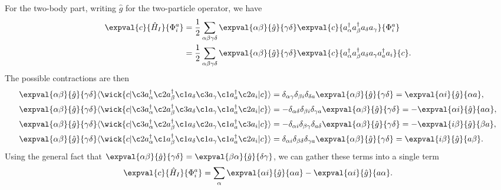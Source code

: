 For the two-body part, writing $\hat{g}$ for the two-particle operator, we have
\begin{align*}
    \expval{c}{\hat{H}_I}{\Phi_i^a} &= \frac{1}{2} \sum_{\alpha\beta\gamma\delta} \expval{\alpha\beta}{\hat{g}}{\gamma\delta} \expval{c}{a_\alpha^\dagger a_\beta^\dagger a_\delta a_\gamma}{\Phi_i^a} \\
    &= \frac{1}{2} \sum_{\alpha\beta\gamma\delta} \expval{\alpha\beta}{\hat{g}}{\gamma\delta} \expval{c}{a_\alpha^\dagger a_\beta^\dagger a_\delta a_\gamma a_a^\dagger a_i}{c}.
\end{align*}
The possible contractions are then
\begin{align*}
    \expval{\alpha\beta}{\hat{g}}{\gamma\delta} \langle
    \wick{
        c
        \vert
        \c3 a_\alpha^\dagger \c2 a_\beta^\dagger \c1 a_\delta \c3 a_\gamma \c1 a_a^\dagger \c2 a_i
        \vert
        c
    }
    \rangle
    &= \delta_{\alpha \gamma} \delta_{\beta i} \delta_{\delta a} \expval{\alpha\beta}{\hat{g}}{\gamma\delta}
    = \expval{\alpha i}{\hat{g}}{\alpha a}, \\
    \expval{\alpha\beta}{\hat{g}}{\gamma\delta} \langle
    \wick{
        c
        \vert
        \c3 a_\alpha^\dagger \c2 a_\beta^\dagger \c3 a_\delta \c1 a_\gamma \c1 a_a^\dagger \c2 a_i
        \vert
        c
    }
    \rangle
    &= -\delta_{\alpha \delta} \delta_{\beta i} \delta_{\gamma a} \expval{\alpha\beta}{\hat{g}}{\gamma\delta} = -\expval{\alpha i}{\hat{g}}{a \alpha}, \\
    \expval{\alpha\beta}{\hat{g}}{\gamma\delta} \langle
    \wick{
        c
        \vert
        \c3 a_\alpha^\dagger \c2 a_\beta^\dagger \c1 a_\delta \c2 a_\gamma \c1 a_a^\dagger \c3 a_i
        \vert
        c
    }
    \rangle
    &= -\delta_{\alpha i} \delta_{\beta \gamma} \delta_{a \delta} \expval{\alpha\beta}{\hat{g}}{\gamma\delta} = -\expval{i \beta}{\hat{g}}{\beta a}, \\
    \expval{\alpha\beta}{\hat{g}}{\gamma\delta} \langle
    \wick{
        c
        \vert
        \c2 a_\alpha^\dagger \c1 a_\beta^\dagger \c1 a_\delta \c1 a_\gamma \c1 a_a^\dagger \c2 a_i
        \vert
        c
    }
    \rangle
    &= \delta_{\alpha i} \delta_{\beta \delta} \delta_{\gamma a} \expval{\alpha\beta}{\hat{g}}{\gamma\delta} = \expval{i \beta}{\hat{g}}{a \beta}.
\end{align*}
Using the general fact that $\expval{\alpha \beta}{\hat{g}}{\gamma \delta} = \expval{\beta \alpha}{\hat{g}}{\delta \gamma}$, we can gather these terms into a single term
\begin{equation*}
    \expval{c}{\hat{H}_I}{\Phi_i^a} = \sum_{\alpha} \expval{\alpha i}{\hat{g}}{\alpha a} - \expval{\alpha i}{\hat{g}}{a \alpha}.
\end{equation*}

